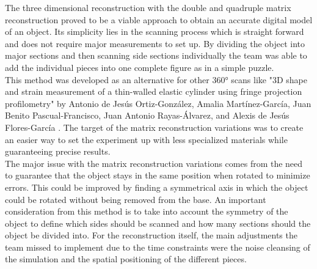 


The three dimensional reconstruction with the double and quadruple matrix reconstruction proved to be a viable approach to obtain an accurate digital model of an object. Its simplicity lies in the scanning process which is straight forward and does not require major measurements to set up. By dividing the object into major sections and then scanning side sections individually the team was able to add the individual pieces into one complete figure as in a simple puzzle. \\

This method was developed as an alternative for other 360° scans like "3D shape and strain measurement of a thin-walled elastic cylinder using fringe projection profilometry" by Antonio de Jesús Ortiz-González, Amalia Martínez-García, Juan Benito Pascual-Francisco, Juan Antonio Rayas-Álvarez, and Alexis de Jesús Flores-García \cite{de20213d}. The target of the matrix reconstruction variations was to create an easier way to set the experiment up with less specialized materials while guaranteeing precise results. \\

The major issue with the matrix reconstruction variations comes from the need to guarantee that the object stays in the same position when rotated to minimize errors. This could be improved by finding a symmetrical axis in which the object could be rotated without being removed from the base. An important consideration from this method is to take into account the symmetry of the object to define which sides should be scanned and how many sections should the object be divided into. For the reconstruction itself, the main adjustments the team missed to implement due to the time constraints were the noise cleansing of the simulation and the spatial positioning of the different pieces. \\

